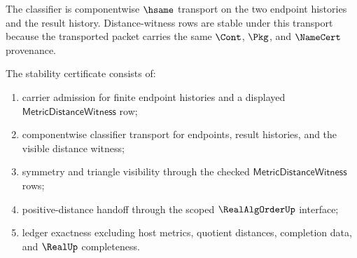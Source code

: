 \begin{definition}
\label{def:metric-classifier-specification}
The classifier is componentwise $\hsame$ transport on the two endpoint
histories and the result history. Distance-witness rows are stable under this
transport because the transported packet carries the same $\Cont$, $\Pkg$, and
$\NameCert$ provenance.
\end{definition}

\begin{definition}
\label{def:metric-stability-certificate}
The stability certificate consists of:
\begin{enumerate}
  \item carrier admission for finite endpoint histories and a displayed
  $\mathsf{MetricDistanceWitness}$ row;
  \item componentwise classifier transport for endpoints, result histories,
  and the visible distance witness;
  \item symmetry and triangle visibility through the checked
  $\mathsf{MetricDistanceWitness}$ rows;
  \item positive-distance handoff through the scoped $\RealAlgOrderUp$
  interface;
  \item ledger exactness excluding host metrics, quotient distances,
  completion data, and $\RealUp$ completeness.
\end{enumerate}
\end{definition}

